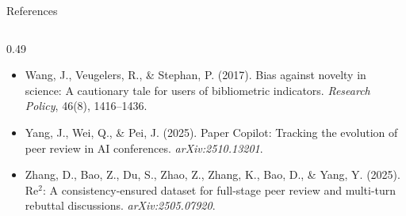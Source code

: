 \documentclass[aspectratio=169,11pt]{beamer}
\begin{document}
\begin{frame}{References}
\begin{columns}[T]
\begin{column}{0.49\textwidth}
\begin{itemize}
        \item[] Wang, J., Veugelers, R., \& Stephan, P. (2017). Bias against novelty in science: A cautionary tale for users of bibliometric indicators. \emph{Research Policy}, 46(8), 1416--1436.
        \item[] Yang, J., Wei, Q., \& Pei, J. (2025). Paper Copilot: Tracking the evolution of peer review in AI conferences. \emph{arXiv:2510.13201}.
        \item[] Zhang, D., Bao, Z., Du, S., Zhao, Z., Zhang, K., Bao, D., \& Yang, Y. (2025). Re$^2$: A consistency-ensured dataset for full-stage peer review and multi-turn rebuttal discussions. \emph{arXiv:2505.07920}.
      \end{itemize}
    \end{column}
  \end{columns}
\end{frame}
\end{document}
